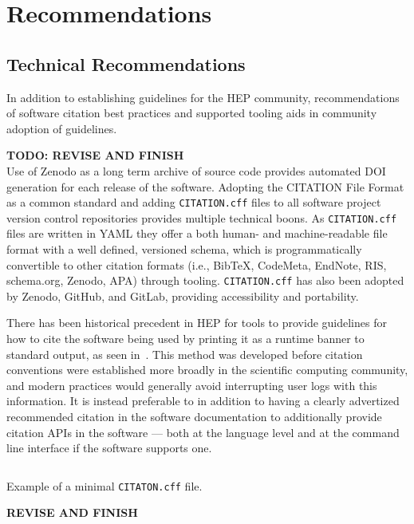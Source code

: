\section{Recommendations}\label{sec:recommendations}

\subsection{Technical Recommendations}\label{sec:recommendations_technical}

In addition to establishing guidelines for the HEP community, recommendations of software citation best practices and supported tooling aids in community adoption of guidelines.

\textbf{TODO: REVISE AND FINISH}\\
Use of Zenodo as a long term archive of source code provides automated DOI generation for each release of the software.
Adopting the CITATION File Format as a common standard and adding \texttt{CITATION.cff} files to all software project version control repositories provides multiple technical boons.
As \texttt{CITATION.cff} files are written in YAML they offer a both human- and machine-readable file format with a well defined, versioned schema, which is programmatically convertible to other citation formats (i.e., BibTeX, CodeMeta, EndNote, RIS, schema.org, Zenodo, APA) through tooling.
\texttt{CITATION.cff} has also been adopted by Zenodo, GitHub, and GitLab, providing accessibility and portability.

There has been historical precedent in HEP for tools to provide guidelines for how to cite the software being used by printing it as a runtime banner to standard output, as seen in~.
This method was developed before citation conventions were established more broadly in the scientific computing community, and modern practices would generally avoid interrupting user logs with this information.
It is instead preferable to in addition to having a clearly advertized recommended citation in the software documentation to additionally provide citation APIs in the software --- both at the language level and at the command line interface if the software supports one.



\setcounter{listing}{1}
\begin{listing}
 \inputminted{yaml}{src/code/CITATION.cff}
 \caption{Example of a minimal \texttt{CITATON.cff} file.}
 \label{lst:cation.cff}
\end{listing}

\textbf{REVISE AND FINISH}
